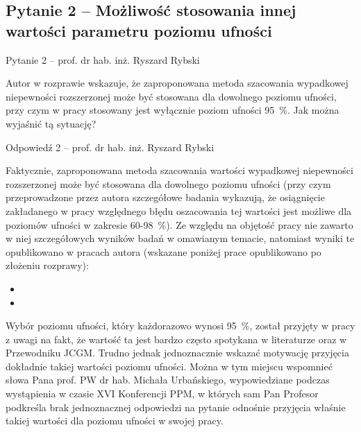 \documentclass[12pt, polish, aspectratio = 169]{slides}
\begin{document}
\subsection{Pytanie 2 -- Możliwość stosowania innej wartości parametru poziomu ufności}

\begin{frame}{Pytanie 2 -- prof. dr hab. inż. Ryszard Rybski}\large
\begin{justify}
Autor w rozprawie wskazuje, że zaproponowana metoda szacowania wypadkowej niepewności rozszerzonej może być stosowana dla dowolnego poziomu ufności, przy czym w pracy stosowany jest wyłącznie poziom ufności \qty{95}{\percent}. Jak można wyjaśnić tą sytuację?
\end{justify}
\end{frame}

\begin{frame}[allowframebreaks]{Odpowiedź 2 -- prof. dr hab. inż. Ryszard Rybski}\small
\begin{justify}
Faktycznie, zaproponowana metoda szacowania wartości wypadkowej niepewności rozszerzonej może być stosowana dla dowolnego poziomu ufności (przy czym przeprowadzone przez autora szczegółowe badania wykazują, że osiągnięcie zakładanego w pracy względnego błędu oszacowania tej wartości jest możliwe dla poziomów ufności w zakresie \num{60}-\qty{98}{\percent}). Ze względu na objętość pracy nie zawarto w niej szczegółowych wyników badań w omawianym temacie, natomiast wyniki te opublikowano w pracach autora (wskazane poniżej prace opublikowano po złożeniu rozprawy):

\begin{itemize}
\item {}
\item {}
\end{itemize}

Wybór poziomu ufności, który każdorazowo wynosi \qty{95}{\percent}, został przyjęty w pracy z uwagi na fakt, że wartość ta jest bardzo często spotykana w literaturze oraz w Przewodniku JCGM. Trudno jednak jednoznacznie wskazać motywację przyjęcia dokładnie takiej wartości poziomu ufności. Można w tym miejscu wspomnieć słowa Pana prof. PW dr hab. Michała Urbańskiego, wypowiedziane podczas wystąpienia w czasie XVI Konferencji PPM, w których sam Pan Profesor podkreśla brak jednoznacznej odpowiedzi na pytanie odnośnie przyjęcia właśnie takiej wartości dla poziomu ufności w swojej pracy.
\end{justify}
\end{frame}
\end{document}
